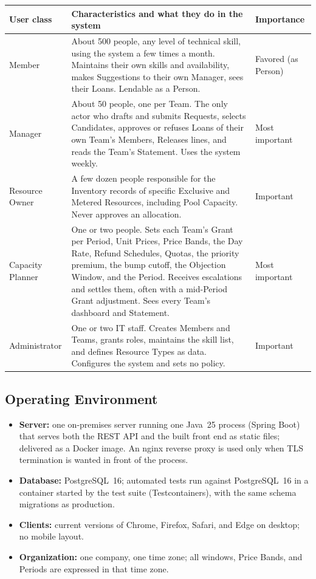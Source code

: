 {\small
\begin{tabularx}{\textwidth}{@{}L{2.6cm}YL{2.2cm}@{}}
\toprule
\textbf{User class} & \textbf{Characteristics and what they do in the system} & \textbf{Importance} \\
\midrule
Member & About 500 people, any level of technical skill, using the system a few times a month. Maintains their own skills and availability, makes Suggestions to their own Manager, sees their Loans. Lendable as a Person. & Favored (as Person) \\
Manager & About 50 people, one per Team. The only actor who drafts and submits Requests, selects Candidates, approves or refuses Loans of their own Team's Members, Releases lines, and reads the Team's Statement. Uses the system weekly. & Most important \\
Resource Owner & A few dozen people responsible for the Inventory records of specific Exclusive and Metered Resources, including Pool Capacity. Never approves an allocation. & Important \\
Capacity Planner & One or two people. Sets each Team's Grant per Period, Unit Prices, Price Bands, the Day Rate, Refund Schedules, Quotas, the priority premium, the bump cutoff, the Objection Window, and the Period. Receives escalations and settles them, often with a mid-Period Grant adjustment. Sees every Team's dashboard and Statement. & Most important \\
Administrator & One or two IT staff. Creates Members and Teams, grants roles, maintains the skill list, and defines Resource Types as data. Configures the system and sets no policy. & Important \\
\bottomrule
\end{tabularx}
}

\subsection{Operating Environment}

\begin{itemize}
  \item \textbf{Server:} one on-premises server running one Java~25 process (Spring Boot) that serves both the REST API and the built front end as static files; delivered as a Docker image. An nginx reverse proxy is used only when TLS termination is wanted in front of the process.
  \item \textbf{Database:} PostgreSQL~16; automated tests run against PostgreSQL~16 in a container started by the test suite (Testcontainers), with the same schema migrations as production.
  \item \textbf{Clients:} current versions of Chrome, Firefox, Safari, and Edge on desktop; no mobile layout.
  \item \textbf{Organization:} one company, one time zone; all windows, Price Bands, and Periods are expressed in that time zone.
\end{itemize}

